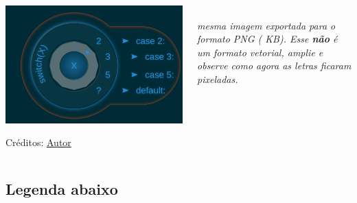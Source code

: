 \documentclass[aspectratio=169]{beamer}
\begin{document}
\begin{frame}[t]\frametitle{\secname}\framesubtitle{\subsecname}
  \begin{columns}[T]
    \begin{column}{9.75cm}
      \includegraphics[width=\columnwidth]{images/bitmap/switch.png}%
      \par\vspace*{-1.8\baselineskip}\hfill{}\colorbox{base2}{\footnotesize\color{base02}Créditos: \href{https://github.com/roger-willian}{Autor}}
    \end{column}
    \begin{column}{4.25cm}
      \it{}\\
      mesma imagem exportada para o formato PNG ( KB).
      Esse \textbf{não} é um formato vetorial, amplie e observe como agora as letras ficaram pixeladas.
    \end{column}
  \end{columns}
\end{frame}

\subsection{Legenda abaixo}
\end{document}
